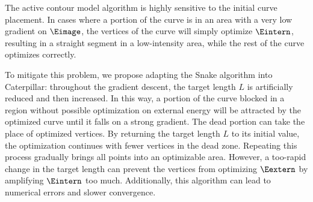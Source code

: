 The active contour model algorithm is highly sensitive to the initial curve placement. In cases where a portion of the curve is in an area with a very low gradient on $\Eimage$, the vertices of the curve will simply optimize $\Eintern$, resulting in a straight segment in a low-intensity area, while the rest of the curve optimizes correctly.

To mitigate this problem, we propose adapting the Snake algorithm into Caterpillar: throughout the gradient descent, the target length $L$ is artificially reduced and then increased. In this way, a portion of the curve blocked in a region without possible optimization on external energy will be attracted by the optimized curve until it falls on a strong gradient. The dead portion can take the place of optimized vertices. By returning the target length $L$ to its initial value, the optimization continues with fewer vertices in the dead zone. Repeating this process gradually brings all points into an optimizable area. However, a too-rapid change in the target length can prevent the vertices from optimizing $\Eextern$ by amplifying $\Eintern$ too much. Additionally, this algorithm can lead to numerical errors and slower convergence.
